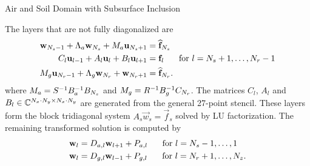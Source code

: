 \documentclass[handout]{beamer}
\begin{document}


\begin{frame}{Air and Soil Domain with Subsurface Inclusion}
\twoDimensionalDomainInclusionGrid
\end{frame}


\begin{frame}
The layers that are not fully diagonalized are
\begin{align*}
\vec{w}_{\ns-1}+\Lambda_a\vec{w}_\ns+M_a\vec{u}_{\ns+1}&= \hat{\vec{f}}_\ns \\
%
C_{l}\vec{u}_{l-1}+A_{l}\vec{u}_l+B_{l}\vec{u}_{l+1}&= \vec{f}_l\eqntab \text{ for }l=\ns+1,\dots, \nr-1 \\
%
M_g\vec{u}_{\nr-1}+\Lambda_g\vec{w}_{\nr}+\vec{w}_{\nr+1}&= \hat{\vec{f}}_{\nr}.
\end{align*}
where $M_a=S^{-1}B_a^{-1}B_{{N_s}}$ and $M_g=R^{-1}B_g^{-1}C_{{N_r}}$. The matrices $C_l$, $A_l$ and $B_l\in\mathbb{C}^{{N_x}\cdot{N_y}\times{N_x}\cdot{N_y}}$ are generated from the general 27-point stencil.  These layers form the block tridiagonal system $A_s\vec{w}_s=\vec{f}_s$ solved by LU factorization. The remaining transformed solution is computed by 
\begin{align*}
\mathbf{w}_l &= D_{a,l}\mathbf{w}_{l+1} + P_{a,l}\hspace{5mm}\text{ for }l={N_s}-1,\dots,1\\
\mathbf{w}_l &= D_{g,l}\mathbf{w}_{l-1} + P_{g,l}\hspace{5mm}\text{ for }l={N_r}+1,\dots,{N_z}.
\end{align*}
\end{frame}

%
\end{document}
